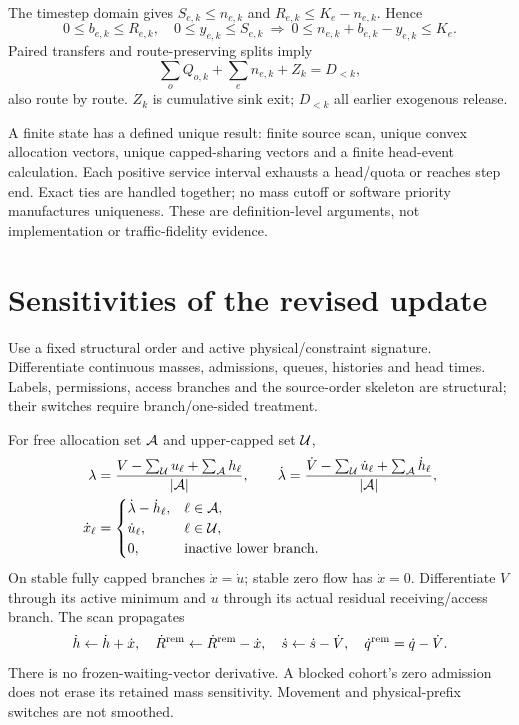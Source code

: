 \documentclass[10pt,a4paper]{article}
\begin{document}
The timestep domain gives $S_{e,k}\leq n_{e,k}$ and
$R_{e,k}\leq K_e-n_{e,k}$. Hence
\begin{equation}
 0\leq b_{e,k}\leq R_{e,k},\quad0\leq y_{e,k}\leq S_{e,k}
 \ \Longrightarrow\
 0\leq n_{e,k}+b_{e,k}-y_{e,k}\leq K_e .
 \label{eq:storage-bound}
\end{equation}
Paired transfers and route-preserving splits imply
\begin{equation}
 \sum_oQ_{o,k}+\sum_en_{e,k}+Z_k=D_{<k},
 \label{eq:mass-identity}
\end{equation}
also route by route. $Z_k$ is cumulative sink exit; $D_{<k}$ all earlier
exogenous release.

A finite state has a defined unique result: finite source scan, unique
convex allocation vectors, unique capped-sharing vectors and a finite
head-event calculation. Each positive service interval exhausts a
head/quota or reaches step end. Exact ties are handled together; no
mass cutoff or software priority manufactures uniqueness. These are
definition-level arguments, not implementation or traffic-fidelity evidence.

\section{Sensitivities of the revised update}

Use a fixed structural order and active physical/constraint signature.
Differentiate continuous masses, admissions, queues, histories and head
times. Labels, permissions, access branches and the source-order skeleton
are structural; their switches require branch/one-sided treatment.

For free allocation set ${\cal A}$ and upper-capped set ${\cal U}$,
\begin{align}
 \lambda&=\frac{V-\sum_{\cal U}u_\ell+\sum_{\cal A}h_\ell}
                  {|{\cal A}|},\qquad
 \dot\lambda=\frac{\dot V-\sum_{\cal U}\dot u_\ell+
                                  \sum_{\cal A}\dot h_\ell}
                  {|{\cal A}|},\nonumber\\
 \dot x_\ell&=
 \begin{cases}
 \dot\lambda-\dot h_\ell,&\ell\in{\cal A},\\
 \dot u_\ell,&\ell\in{\cal U},\\
 0,&\text{inactive lower branch}.
 \end{cases}
 \label{eq:allocation-derivative}
\end{align}
On stable fully capped branches $\dot x=\dot u$; stable zero flow has
$\dot x=0$. Differentiate $V$ through its active minimum and $u$ through
its actual residual receiving/access branch. The scan propagates
\begin{equation}
 \dot h\leftarrow\dot h+\dot x,\quad
 \dot R^{\rm rem}\leftarrow\dot R^{\rm rem}-\dot x,\quad
 \dot s\leftarrow\dot s-\dot V,\quad
 \dot q^{\rm rem}=\dot q-\dot V .
 \label{eq:scan-derivative}
\end{equation}
There is no frozen-waiting-vector derivative. A blocked cohort's zero
admission does not erase its retained mass sensitivity. Movement and
physical-prefix switches are not smoothed.
\end{document}
